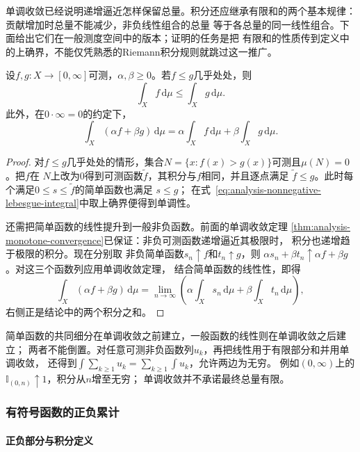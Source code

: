 单调收敛已经说明递增逼近怎样保留总量。积分还应继承有限和的两个基本规律：贡献增加时总量不能减少，非负线性组合的总量
等于各总量的同一线性组合。下面给出它们在一般测度空间中的版本；证明的任务是把
有限和的性质传到定义中的上确界，不能仅凭熟悉的Riemann积分规则就跳过这一推广。
\begin{lemma}[非负积分的线性与单调性]
\label{lem:analysis-nonnegative-integral-properties}
设$f,g:X\to[0,\infty]$可测，$\alpha,\beta\geq0$。若$f\leq g$几乎处处，则
\[
  \int_X f\,\mathrm{d}\mu\leq\int_X g\,\mathrm{d}\mu.
\]
此外，在$0\cdot\infty=0$的约定下，
\[
  \int_X(\alpha f+\beta g)\,\mathrm{d}\mu
  =
  \alpha\int_X f\,\mathrm{d}\mu
  +
  \beta\int_X g\,\mathrm{d}\mu.
\]
\end{lemma}
\begin{proof}
对$f\leq g$几乎处处的情形，集合$N=\{x:f(x)>g(x)\}$可测且$\mu(N)=0$。把$f$在
$N$上改为$0$得到可测函数$\widetilde f$，其积分与$f$相同，并且逐点满足
$\widetilde f\leq g$。此时每个满足$0\leq s\leq\widetilde f$的简单函数也满足
$s\leq g$；
在式~\eqref{eq:analysis-nonnegative-lebesgue-integral}中取上确界便得到单调性。

还需把简单函数的线性提升到一般非负函数。前面的单调收敛定理
\ref{thm:analysis-monotone-convergence}已保证：非负可测函数递增逼近其极限时，
积分也递增趋于极限的积分。现在分别取
非负简单函数$s_n\uparrow f$和$t_n\uparrow g$，则
$\alpha s_n+\beta t_n\uparrow\alpha f+\beta g$。对这三个函数列应用单调收敛定理，
结合简单函数的线性性，即得
\[
  \int_X(\alpha f+\beta g)\,\mathrm{d}\mu
  =
  \lim_{n\to\infty}
  \left(
    \alpha\int_Xs_n\,\mathrm{d}\mu
    +
    \beta\int_Xt_n\,\mathrm{d}\mu
  \right),
\]
右侧正是结论中的两个积分之和。
\end{proof}

简单函数的共同细分在单调收敛之前建立，一般函数的线性则在单调收敛之后建立；
两者不能倒置。对任意可测非负函数列$u_k$，再把线性用于有限部分和并用单调收敛，
还得到$\int\sum_{k\geq1}u_k=\sum_{k\geq1}\int u_k$，允许两边为无穷。
例如$(0,\infty)$上的$\mathbb I_{(0,n)}\uparrow1$，积分从$n$增至无穷；
单调收敛并不承诺最终总量有限。

\subsubsection{有符号函数的正负累计}
\paragraph{正负部分与积分定义}

